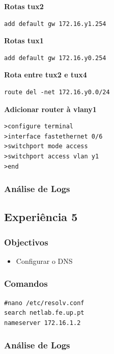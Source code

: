 \documentclass[a4paper,11pt]{article}
\begin{document}
\textbf{Rotas tux2} 
\begin{lstlisting}
add default gw 172.16.y1.254
\end{lstlisting}

\textbf{Rotas tux1}
\begin{lstlisting}
add default gw 172.16.y0.254
\end{lstlisting}

\textbf{Rota entre tux2 e tux4}
\begin{lstlisting}
route del -net 172.16.y0.0/24
\end{lstlisting}

\textbf{Adicionar router à vlany1}

\begin{lstlisting}
>configure terminal
>interface fastethernet 0/6
>switchport mode access
>switchport access vlan y1
>end
\end{lstlisting}

\subsubsection{Análise de Logs}

\subsection{Experiência 5}
\subsubsection{Objectivos}

\begin{itemize}
\item Configurar o DNS
\end{itemize}

\subsubsection{Comandos}

\begin{lstlisting}
#nano /etc/resolv.conf
search netlab.fe.up.pt
nameserver 172.16.1.2
\end{lstlisting}

\subsubsection{Análise de Logs}
\end{document}
